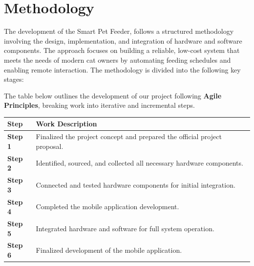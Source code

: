 \documentclass[10pt,a4paper]{extarticle}
\begin{document}
\vspace{8pt}

\section{Methodology}

The development of the Smart Pet Feeder, follows a structured methodology involving the design, implementation, and integration of hardware and software components. The approach focuses on building a reliable, low-cost system that meets the needs of modern cat owners by automating feeding schedules and enabling remote interaction. The methodology is divided into the following key stages:

The table below outlines the development of our project following \textbf{Agile Principles}, breaking work into iterative and incremental steps.

\begin{center}
   \renewcommand{\arraystretch}{1}
   \begin{longtable}{@{} p{3cm} p{12cm} @{}}
      \toprule
      \textbf{Step} & \textbf{Work Description} \\
      \midrule
      \textbf{Step 1} & Finalized the project concept and prepared the official project proposal. \\[5pt]
      \textbf{Step 2} & Identified, sourced, and collected all necessary hardware components. \\[5pt]
      \textbf{Step 3} & Connected and tested hardware components for initial integration. \\[5pt]
      \textbf{Step 4} & Completed the mobile application development. \\[5pt]
      \textbf{Step 5} & Integrated hardware and software for full system operation. \\[5pt]
      \textbf{Step 6} & Finalized development of the mobile application. \\
      \bottomrule
   \end{longtable}
\end{center}

\vspace{-\baselineskip}
\end{document}
